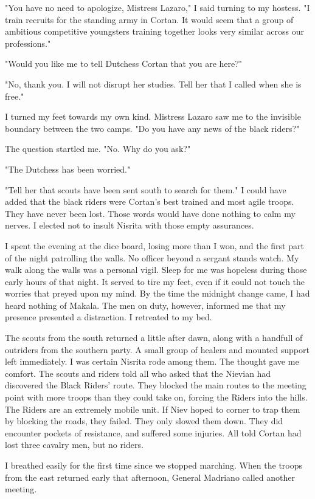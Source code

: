\documentclass{article}
\begin{document}
"You have no need to apologize, Mistress Lazaro," I said turning to my hostess. "I train recruits for the standing army in Cortan. It would seem that a group of ambitious competitive youngsters training together looks very similar across our professions."

"Would you like me to tell Dutchess Cortan that you are here?"

"No, thank you. I will not disrupt her studies. Tell her that I called when she is free."

I turned my feet towards my own kind. Mistress Lazaro saw me to the invisible boundary between the two camps. "Do you have any news of the black riders?"

The question startled me. "No. Why do you ask?"

"The Dutchess has been worried."

"Tell her that scouts have been sent south to search for them." I could have added that the black riders were Cortan's best trained and most agile troops. They have never been lost. Those words would have done nothing to calm my nerves. I elected not to insult Nisrita with those empty assurances.

I spent the evening at the dice board, losing more than I won, and the first part of the night patrolling the walls. No officer beyond a sergant stands watch. My walk along the walls was a personal vigil. Sleep for me was hopeless during those early hours of that night. It served to tire my feet, even if it could not touch the worries that preyed upon my mind. By the time the midnight change came, I had heard nothing of Makala. The men on duty, however, informed me that my presence presented a distraction. I retreated to my bed.

The scouts from the south returned a little after dawn, along with a handfull of outriders from the southern party. A small group of healers and mounted support left immediately. I was certain Nisrita rode among them. The thought gave me comfort. The scouts and riders told all who asked that the Nievian had discovered the Black Riders' route. They blocked the main routes to the meeting point with more troops than they could take on, forcing the Riders into the hills. The Riders are an extremely mobile unit. If Niev hoped to corner to trap them by blocking the roads, they failed. They only slowed them down. They did encounter pockets of resistance, and suffered some injuries. All told Cortan had lost three cavalry men, but no riders. 

I breathed easily for the first time since we stopped marching. When the troops from the east returned early that afternoon, General Madriano called another meeting. 
\end{document}
